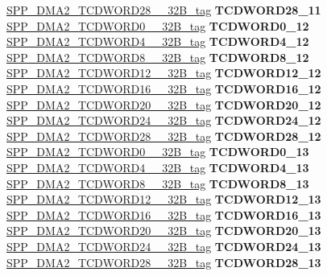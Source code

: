 \begin{DoxyCompactItemize}
\begin{tabbing}
\>\>\mbox{\hyperlink{unionSPP__DMA2__TCDWORD28____32B__tag}{SPP\_DMA2\_TCDWORD28\_\_32B\_tag}} {\bfseries TCDWORD28\_11}\\
\>\>\mbox{\hyperlink{unionSPP__DMA2__TCDWORD0____32B__tag}{SPP\_DMA2\_TCDWORD0\_\_32B\_tag}} {\bfseries TCDWORD0\_12}\\
\>\>\mbox{\hyperlink{unionSPP__DMA2__TCDWORD4____32B__tag}{SPP\_DMA2\_TCDWORD4\_\_32B\_tag}} {\bfseries TCDWORD4\_12}\\
\>\>\mbox{\hyperlink{unionSPP__DMA2__TCDWORD8____32B__tag}{SPP\_DMA2\_TCDWORD8\_\_32B\_tag}} {\bfseries TCDWORD8\_12}\\
\>\>\mbox{\hyperlink{unionSPP__DMA2__TCDWORD12____32B__tag}{SPP\_DMA2\_TCDWORD12\_\_32B\_tag}} {\bfseries TCDWORD12\_12}\\
\>\>\mbox{\hyperlink{unionSPP__DMA2__TCDWORD16____32B__tag}{SPP\_DMA2\_TCDWORD16\_\_32B\_tag}} {\bfseries TCDWORD16\_12}\\
\>\>\mbox{\hyperlink{unionSPP__DMA2__TCDWORD20____32B__tag}{SPP\_DMA2\_TCDWORD20\_\_32B\_tag}} {\bfseries TCDWORD20\_12}\\
\>\>\mbox{\hyperlink{unionSPP__DMA2__TCDWORD24____32B__tag}{SPP\_DMA2\_TCDWORD24\_\_32B\_tag}} {\bfseries TCDWORD24\_12}\\
\>\>\mbox{\hyperlink{unionSPP__DMA2__TCDWORD28____32B__tag}{SPP\_DMA2\_TCDWORD28\_\_32B\_tag}} {\bfseries TCDWORD28\_12}\\
\>\>\mbox{\hyperlink{unionSPP__DMA2__TCDWORD0____32B__tag}{SPP\_DMA2\_TCDWORD0\_\_32B\_tag}} {\bfseries TCDWORD0\_13}\\
\>\>\mbox{\hyperlink{unionSPP__DMA2__TCDWORD4____32B__tag}{SPP\_DMA2\_TCDWORD4\_\_32B\_tag}} {\bfseries TCDWORD4\_13}\\
\>\>\mbox{\hyperlink{unionSPP__DMA2__TCDWORD8____32B__tag}{SPP\_DMA2\_TCDWORD8\_\_32B\_tag}} {\bfseries TCDWORD8\_13}\\
\>\>\mbox{\hyperlink{unionSPP__DMA2__TCDWORD12____32B__tag}{SPP\_DMA2\_TCDWORD12\_\_32B\_tag}} {\bfseries TCDWORD12\_13}\\
\>\>\mbox{\hyperlink{unionSPP__DMA2__TCDWORD16____32B__tag}{SPP\_DMA2\_TCDWORD16\_\_32B\_tag}} {\bfseries TCDWORD16\_13}\\
\>\>\mbox{\hyperlink{unionSPP__DMA2__TCDWORD20____32B__tag}{SPP\_DMA2\_TCDWORD20\_\_32B\_tag}} {\bfseries TCDWORD20\_13}\\
\>\>\mbox{\hyperlink{unionSPP__DMA2__TCDWORD24____32B__tag}{SPP\_DMA2\_TCDWORD24\_\_32B\_tag}} {\bfseries TCDWORD24\_13}\\
\>\>\mbox{\hyperlink{unionSPP__DMA2__TCDWORD28____32B__tag}{SPP\_DMA2\_TCDWORD28\_\_32B\_tag}} {\bfseries TCDWORD28\_13}\\

\end{tabbing}
\end{DoxyCompactItemize}

